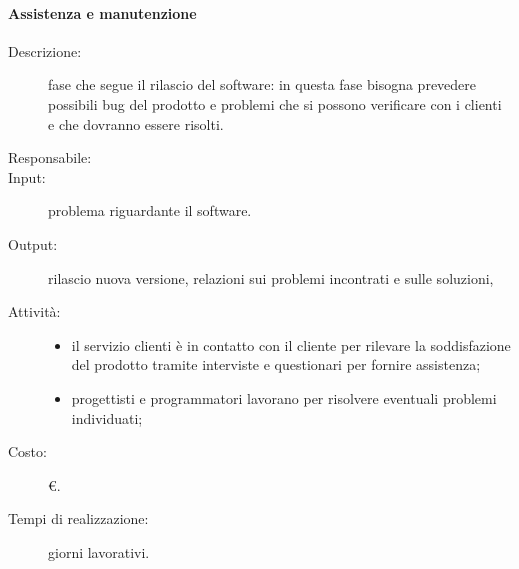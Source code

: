 \paragraph{Assistenza e manutenzione}
\begin{description}
\item[Descrizione:] fase che segue il rilascio del software: in questa fase bisogna prevedere
possibili bug del prodotto e problemi che si possono verificare con i clienti e che dovranno essere risolti.
\item[Responsabile:] 
\item[Input:] problema riguardante il software.
\item[Output:] rilascio nuova versione, relazioni sui problemi incontrati e sulle soluzioni,
\item[Attività:]
\begin{itemize}
\item il servizio clienti è in contatto con il cliente per rilevare la
soddisfazione del prodotto tramite interviste e questionari per fornire assistenza;
\item progettisti e programmatori lavorano per risolvere eventuali problemi individuati;
\end{itemize}
\item[Costo:] \euro{}.
\item[Tempi di realizzazione:]  giorni lavorativi.
\end{description}

